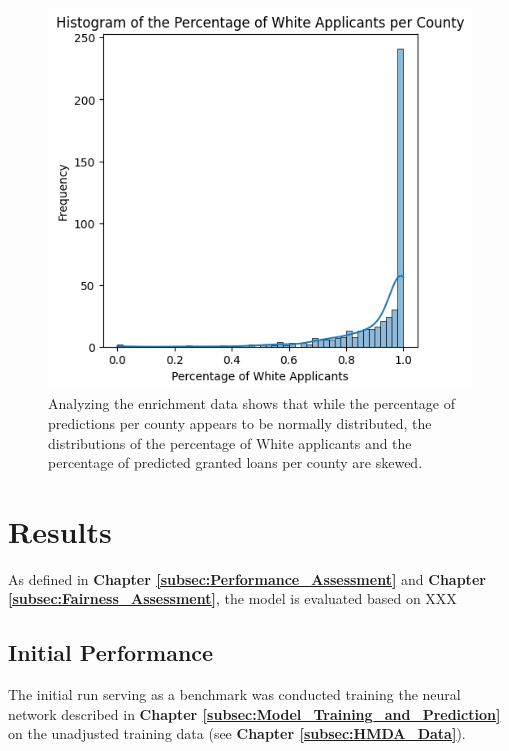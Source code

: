 \begin{figure}[h]
\begin{minipage}{0.33\textwidth}
    \end{minipage}\hfill
    \begin{minipage}{0.33\textwidth}
        \centering
        \includegraphics[width=\textwidth]{images/geo_enrich/white_per_county.png}
    \end{minipage}\hfill
    \label{fig:Enrichment_Data_EDA}
    \caption*{Analyzing the enrichment data shows that while the percentage of predictions per county appears to be normally distributed, the distributions of the percentage of White applicants and the percentage of predicted granted loans per county are skewed.}
\end{figure}


\section{Results}\label{sec:Results}        

As defined in \textbf{Chapter \ref{subsec:Performance_Assessment}} and \textbf{Chapter \ref{subsec:Fairness_Assessment}}, the model is evaluated based on XXX



\subsection{Initial Performance}\label{subsec:Initial_Performance}

The initial run serving as a benchmark was conducted training the neural network described in \textbf{Chapter \ref{subsec:Model_Training_and_Prediction}} on the unadjusted training data (see \textbf{Chapter \ref{subsec:HMDA_Data}}).


